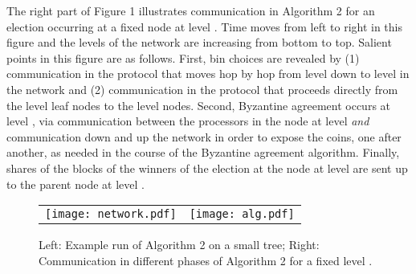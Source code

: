 \documentclass[letterpaper,11pt]{article}
\begin{document}
The right part of Figure 1 illustrates communication in Algorithm 2 for an election occurring at a fixed node at level .  Time moves from left to right in this figure and the levels of the network are increasing from bottom to top.  Salient points in this figure are as follows.   First, bin choices are revealed by (1) communication in the  protocol that moves hop by hop from level  down to level  in the network and (2) communication in the  protocol that proceeds directly from the level  leaf nodes to the level  nodes.  Second, Byzantine agreement occurs at level , via communication between the processors in the node at level  \emph{and} communication down and up the network in order to expose the coins, one after another, as needed in the course of the Byzantine agreement algorithm.  Finally, shares of the blocks of the winners of the election at the node at level  are sent up to the parent node at level .

\begin{figure}[t]
\begin{center}
\begin{tabular}{ll}
\texttt{[image: network.pdf]} &
\texttt{[image: alg.pdf]}
\end{tabular}
\caption{Left: Example run of Algorithm 2 on a small tree; Right: Communication in different phases of Algorithm 2 for a fixed level . }
\end{center}
\label{f:aeBA}
\end{figure}
\end{document}
